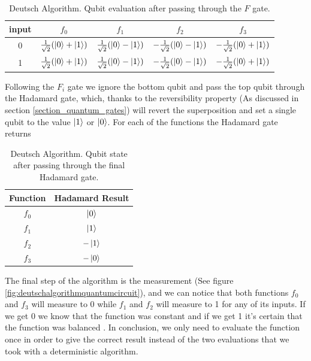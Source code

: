 \documentclass[12pt,a4paper]{scrartcl}
\begin{document}
\begin{table}[H]
    \centering
    \begin{tabular}{|c|c|c|c|c|}
        \hline
         input & $f_0$ & $f_1$ & $f_2$ & $f_3$  \\
         \hline
          0    &   $\frac{1}{\sqrt{2}}(\ket{0} + \ket{1})$   & $\frac{1}{\sqrt{2}}(\ket{0} - \ket{1})$    &   $-\frac{1}{\sqrt{2}}(\ket{0} - \ket{1})$    &  $-\frac{1}{\sqrt{2}}(\ket{0} + \ket{1})$        \\
          \hline
          1    &   $\frac{1}{\sqrt{2}}(\ket{0} + \ket{1})$   & $\frac{1}{\sqrt{2}}(\ket{0} - \ket{1})$    &   $-\frac{1}{\sqrt{2}}(\ket{0} - \ket{1})$    &  $-\frac{1}{\sqrt{2}}(\ket{0} + \ket{1})$      \\
          \hline
    \end{tabular}
    \caption{Deutsch Algorithm. Qubit evaluation after passing through the $F$ gate.}
    \label{tab:deutsch.quantum_intermediate}
\end{table}

Following the $F_i$ gate we ignore the bottom qubit and pass the top qubit through the Hadamard gate, which, thanks to the reversibility property (As discussed in section \ref{section_quantum_gates}) will revert the superposition and set a single qubit to the value $\ket{1}$ or $\ket{0}$. For each of the functions the Hadamard gate returns \\

\begin{table}[H]
    \centering
    \begin{tabular}{|c|c|}
        \hline
         Function & Hadamard Result  \\
          \hline
         $f_0$ & $\ket{0}$ \\
          \hline
        $f_1$ & $\ket{1}$ \\
         \hline
        $f_2$ & $-\ket{1}$ \\
         \hline
        $f_3$ & $-\ket{0}$ \\
         \hline
    \end{tabular}
    \caption{Deutsch Algorithm. Qubit state after passing through the final Hadamard gate.}
    \label{tab:deutsch.quantum_hadamard2}
\end{table}

The final step of the algorithm is the measurement (See figure \ref{fig:deutschalgorithmquantumcircuit}), and we can notice that both functions $f_0$ and $f_3$ will measure to 0 while $f_1$ and $f_2$ will measure to 1 for any of its inputs. If we get 0 we know that the function was constant and if we get 1 it's certain that the function was balanced \cite{bernhardt2019quantum}. In conclusion, we only need to evaluate the function once in order to give the correct result instead of the two evaluations that we took with a deterministic algorithm. \\
\end{document}

